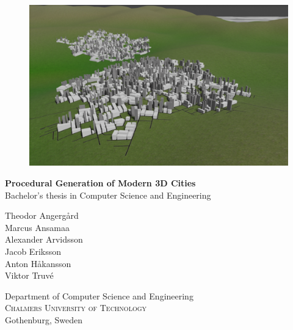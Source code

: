 \begin{titlepage}

  \begin{figure}[H]
    \centering
    \vspace{2cm}	%
    \includegraphics[width=0.9\linewidth]{figure/cover.png}
  \end{figure}

  \renewcommand{\familydefault}{\sfdefault} \normalfont %
  \textbf{{\Huge Procedural Generation of Modern 3D Cities}} 	\\[0.5cm]
  Bachelor's thesis in Computer Science and Engineering \setlength{\parskip}{1cm}

  {\Large
    Theodor Angergård \\[0.1cm]
    Marcus Ansamaa \\[0.1cm]
    Alexander Arvidsson \\[0.1cm]
    Jacob Eriksson \\[0.1cm]
    Anton Håkansson \\[0.1cm]
    Viktor Truvé \\[0.1cm]
  }

  Department of Computer Science and Engineering \\
  \textsc{Chalmers University of Technology} \\
  Gothenburg, Sweden \the\year

  \renewcommand{\familydefault}{\rmdefault} \normalfont %
  \vfill	
\end{titlepage}

\newpage
\restoregeometry
\thispagestyle{empty}
\mbox{}


